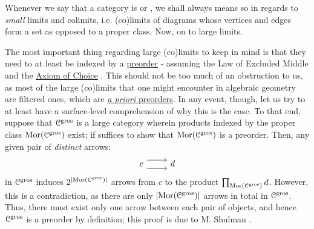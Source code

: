                 \begin{remark} \label{remark: large_limits}
                    Whenever we say that a category is  or , we shall always means so in regards to \textit{small} limits and colimits, i.e. (co)limits of diagrams whose vertices and edges form a set as opposed to a proper class. Now, on to large limits.
                    
                    The most important thing regarding large (co)limits to keep in mind is that they need to at least be indexed by a \href{https://ncatlab.org/nlab/show/preorder}{\underline{preorder}} - assuming the Law of Excluded Middle and the \href{https://ncatlab.org/nlab/show/axiom+of+choice}{\underline{Axiom of Choice}} \cite[Theorem 2.1]{shulman2008set}. This should not be too much of an obstruction to us, as most of the large (co)limits that one might encounter in algebraic geometry are filtered ones, which are \href{https://ncatlab.org/nlab/show/filtered+category}{\underline{\textit{a priori} preorders}}. In any event, though, let us try to at least have a surface-level comprehension of why this is the case. To that end, suppose that $\mathcal{C}^{\mathrm{gros}}$ is a large category wherein products indexed by the proper class $\mathrm{Mor}(\mathcal{C}^{\mathrm{gros}})$  exist; if suffices to show that $\mathrm{Mor}(\mathcal{C}^{\mathrm{gros}})$ is a preorder. Then, any given pair of \textit{distinct } arrows:
                        $$
                            \begin{tikzcd}
                            	c & d
                            	\arrow[shift left=2, from=1-1, to=1-2]
                            	\arrow[shift right=2, from=1-1, to=1-2]
                            \end{tikzcd}
                        $$
                    in $\mathcal{C}^{\mathrm{gros}}$ induces $2^{|\mathrm{Mor}(\mathcal{C}^{\mathrm{gros}})|}$ arrows from $c$ to the product $\prod_{\mathrm{Mor}(\mathcal{C}^{\mathrm{gros}})} d$. However, this is a contradiction, as there are only $|\mathrm{Mor}(\mathcal{C}^{\mathrm{gros}})|$ arrows in total in $\mathcal{C}^{\mathrm{gros}}$. Thus, there must exist only one arrow between each pair of objects, and hence $\mathcal{C}^{\mathrm{gros}}$ is a preorder by definition; this proof is due to M. Shulman \cite[Theorem 2.1]{shulman2008set}. 
                \end{remark}
            
